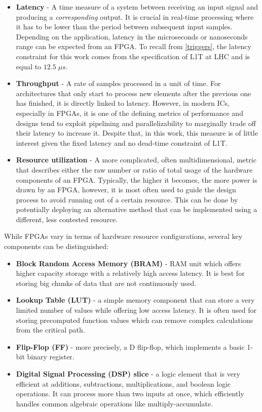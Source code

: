 \begin{itemize}
  \item \textbf{Latency} - A time measure of a system between receiving an input signal and producing a \textit{corresponding} output. It is crucial in real-time processing where it has to be lower than the period between subsequent input samples. Depending on the application, latency in the microseconds or nanoseconds range can be expected from an FPGA. To recall from \cref{triggers}, the latency constraint for this work comes from the specification of L1T at LHC and is equal to \(12.5\; \mu s\).
  \item \textbf{Throughput} - A rate of samples processed in a unit of time. For architectures that only start to process new elements after the previous one has finished, it is directly linked to latency. However, in modern ICs, especially in FPGAs, it is one of the defining metrics of performance and designs tend to exploit pipelining and parallelizability to marginally trade off their latency to increase it. Despite that, in this work, this measure is of little interest given the fixed latency and no dead-time constraint of L1T.
  \item \textbf{Resource utilization} - A more complicated, often multidimensional, metric that describes either the raw number or ratio of total usage of the hardware components of an FPGA. Typically, the higher it becomes, the more power is drawn by an FPGA, however, it is most often used to guide the design process to avoid running out of a certain resource. This can be done by potentially deploying an alternative method that can be implemented using a different, less contested resource. 
\end{itemize}

While FPGAs vary in terms of hardware resource configurations, several key components can be distinguished:

\begin{itemize}
  \item \textbf{Block Random Access Memory (BRAM)} - RAM unit which offers higher capacity storage with a relatively high access latency. It is best for storing big chunks of data that are not continuously used.
  \item \textbf{Lookup Table (LUT)} - a simple memory component that can store a very limited number of values while offering low access latency. It is often used for storing precomputed function values which can remove complex calculations from the critical path.
  \item \textbf{Flip-Flop (FF)} - more precisely, a D flip-flop, which implements a basic 1-bit binary register.
  \item \textbf{Digital Signal Processing (DSP) slice} - a logic element that is very efficient at additions, subtractions, multiplications, and boolean logic operations. It can process more than two inputs at once, which efficiently handles common algebraic operations like multiply-accumulate.
\end{itemize}

